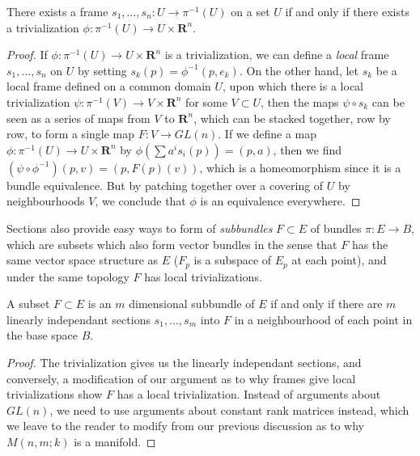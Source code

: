 \begin{theorem}
    There exists a frame $s_1, \dots, s_n: U \to \pi^{-1}(U)$ on a set $U$ if and only if there exists a trivialization $\phi: \pi^{-1}(U) \to U \times \mathbf{R}^n$.
\end{theorem}
\begin{proof}
    If $\phi: \pi^{-1}(U) \to U \times \mathbf{R}^n$ is a trivialization, we can define a {\it local} frame $s_1, \dots, s_n$ on $U$ by setting $s_k(p) = \phi^{-1}(p,e_k)$. On the other hand, let $s_k$ be a local frame defined on a common domain $U$, upon which there is a local trivialization $\psi: \pi^{-1}(V) \to V \times \mathbf{R}^n$ for some $V \subset U$, then the maps $\psi \circ s_k$ can be seen as a series of maps from $V$ to $\mathbf{R}^n$, which can be stacked together, row by row, to form a single map $F: V \to GL(n)$. If we define a map $\phi: \pi^{-1}(U) \to U \times \mathbf{R}^n$ by $\phi(\sum a^i s_i(p)) = (p,a)$, then we find $(\psi \circ \phi^{-1})(p,v) = (p,F(p)(v))$, which is a homeomorphism since it is a bundle equivalence. But by patching together over a covering of $U$ by neighbourhoods $V$, we conclude that $\phi$ is an equivalence everywhere.
\end{proof}

Sections also provide easy ways to form of \emph{subbundles} $F \subset E$ of bundles $\pi: E \to B$, which are subsets which also form vector bundles in the sense that $F$ has the same vector space structure as $E$ ($F_p$ is a subspace of $E_p$ at each point), and under the same topology $F$ has local trivializations.

\begin{theorem}
    A subset $F \subset E$ is an $m$ dimensional subbundle of $E$ if and only if there are $m$ linearly independant sections $s_1, \dots, s_m$ into $F$ in a neighbourhood of each point in the base space $B$.
\end{theorem}
\begin{proof}
    The trivialization gives us the linearly independant sections, and conversely, a modification of our argument as to why frames give local trivializations show $F$ has a local trivialization. Instead of arguments about $GL(n)$, we need to use arguments about constant rank matrices instead, which we leave to the reader to modify from our previous discussion as to why $M(n,m;k)$ is a manifold.
\end{proof}

